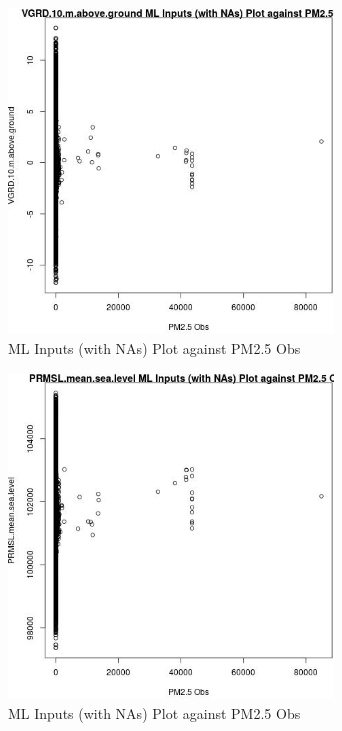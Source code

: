 \begin{figure} 
\centering  
\includegraphics[width=0.77\textwidth]{Code_Outputs/Report_ML_input_PM25_Step4_part_f_de_duplicated_aves_prioritize_24hr_obswNAs_VGRD10mabovegroundvPM25_Obs.jpg} 
\caption{\label{fig:Report_ML_input_PM25_Step4_part_f_de_duplicated_aves_prioritize_24hr_obswNAsVGRD10mabovegroundvPM25_Obs}ML Inputs (with NAs) Plot against PM2.5 Obs} 
\end{figure} 
 

\begin{figure} 
\centering  
\includegraphics[width=0.77\textwidth]{Code_Outputs/Report_ML_input_PM25_Step4_part_f_de_duplicated_aves_prioritize_24hr_obswNAs_PRMSLmeansealevelvPM25_Obs.jpg} 
\caption{\label{fig:Report_ML_input_PM25_Step4_part_f_de_duplicated_aves_prioritize_24hr_obswNAsPRMSLmeansealevelvPM25_Obs}ML Inputs (with NAs) Plot against PM2.5 Obs} 
\end{figure} 
 

